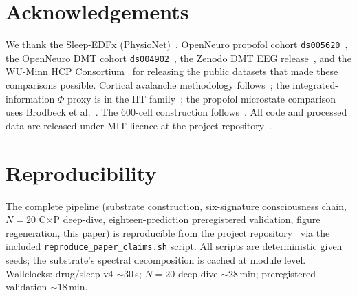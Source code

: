 \documentclass[11pt]{article}
\begin{document}











\section*{Acknowledgements}
We thank the Sleep-EDFx (PhysioNet)~\citep{PhysioNet2000,SleepEDFx},
OpenNeuro propofol cohort \texttt{ds005620}~\citep{OpenNeuroDS005620},
the OpenNeuro DMT cohort \texttt{ds004902}~\citep{OpenNeuroDS004902},
the Zenodo DMT EEG release~\citep{ZenodoDMT3992359}, and the WU-Minn
HCP Consortium~\citep{VanEssen2013HCP} for releasing the public
datasets that made these comparisons possible. Cortical avalanche
methodology follows~\citep{BeggsPlenz2003}; the integrated-information
$\Phi$ proxy is in the IIT family~\citep{Tononi2008,BalduzziTononi2008};
the propofol microstate comparison uses Brodbeck et
al.~\citep{Brodbeck2012Microstates}. The 600-cell construction
follows~\citep{CoxeterRegularPolytopes,Weisstein600Cell}. All code
and processed data are released under MIT licence at the project
repository~\citep{ariaChessRepo}.

\section*{Reproducibility}
The complete pipeline (substrate construction, six-signature
consciousness chain, $N\!=\!20$ C$\times$P deep-dive, eighteen-prediction
preregistered validation, figure regeneration, this paper) is reproducible
from the project repository~\citep{ariaChessRepo} via the included
\texttt{reproduce\_paper\_claims.sh} script. All scripts are
deterministic given seeds; the substrate's spectral decomposition is
cached at module level. Wallclocks: drug/sleep v4 $\sim 30$\,s;
$N\!=\!20$ deep-dive $\sim 28$\,min; preregistered validation
$\sim 18$\,min.



\end{document}
